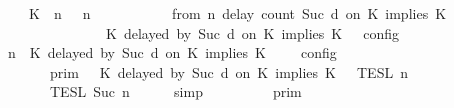 \begin{isabellebody}
\ \ \ \ {\isasymunion}\ {\isasymlbrakk}\ {\isacharparenleft}{\isacharparenleft}K\ {\isasymUp}\ n{\isacharparenright}\ {\isacharhash}\ {\isasymGamma}{\isacharparenright}{\isacharcomma}\ n\isanewline
\ \ \ \ \ \ \ \ {\isasymturnstile}\ {\isasymPsi}\ {\isasymtriangleright}\ {\isacharparenleft}{\isacharparenleft}from\ n\ delay\ count\ {\isacharparenleft}Suc\ d{\isacharparenright}\ on\ K\ implies\ K\isanewline
\ \ \ \ \ \ \ \ \ \ \ \ \ \ \ \ {\isacharhash}\ {\isacharparenleft}K\ delayed\ by\ {\isacharparenleft}Suc\ d{\isacharparenright}\ on\ K\ implies\ K\ {\isacharhash}\ {\isasymPhi}{\isacharparenright}\ {\isasymrbrakk}\isactrlsub c\isactrlsub o\isactrlsub n\isactrlsub f\isactrlsub i\isactrlsub g\isanewline
\ \ {\isacartoucheclose}\isanewline
%
\isadelimproof
%
\endisadelimproof
%
\isatagproof
{}\isamarkupfalse%
\ {\isacharminus}\isanewline
\ \ \isamarkupfalse%
\ {\isacartoucheopen}{\isasymlbrakk}\ {\isasymGamma}{\isacharcomma}\ n\ {\isasymturnstile}\ {\isacharparenleft}{\isacharparenleft}K\ delayed\ by\ {\isacharparenleft}Suc\ d{\isacharparenright}\ on\ K\ implies\ K\ {\isacharhash}\ {\isasymPsi}{\isacharparenright}\ {\isasymtriangleright}\ {\isasymPhi}\ {\isasymrbrakk}\isactrlsub c\isactrlsub o\isactrlsub n\isactrlsub f\isactrlsub i\isactrlsub g\isanewline
\ \ \ \ \ \ {\isacharequal}\ {\isasymlbrakk}{\isasymlbrakk}\ {\isasymGamma}\ {\isasymrbrakk}{\isasymrbrakk}\isactrlsub p\isactrlsub r\isactrlsub i\isactrlsub m\ {\isasyminter}\ {\isasymlbrakk}{\isasymlbrakk}\ {\isacharparenleft}K\ delayed\ by\ {\isacharparenleft}Suc\ d{\isacharparenright}\ on\ K\ implies\ K\ {\isacharhash}\ {\isasymPsi}\ {\isasymrbrakk}{\isasymrbrakk}\isactrlsub T\isactrlsub E\isactrlsub S\isactrlsub L\isactrlbsup {\isasymge}\ n\isactrlesup \isanewline
\ \ \ \ \ \ {\isasyminter}\ {\isasymlbrakk}{\isasymlbrakk}\ {\isasymPhi}\ {\isasymrbrakk}{\isasymrbrakk}\isactrlsub T\isactrlsub E\isactrlsub S\isactrlsub L\isactrlbsup {\isasymge}\ Suc\ n\isactrlesup {\isacartoucheclose}\isanewline
\ \ \ \ \isamarkupfalse%
\ simp\isanewline
\ \ \isamarkupfalse%
\ \isamarkupfalse%
\ {\isacartoucheopen}{\isachardot}{\isachardot}{\isachardot}\ {\isacharequal}\ {\isasymlbrakk}{\isasymlbrakk}\ {\isasymGamma}\ {\isasymrbrakk}{\isasymrbrakk}\isactrlsub p\isactrlsub r\isactrlsub i\isactrlsub m\ \isanewline

\end{isabellebody}

